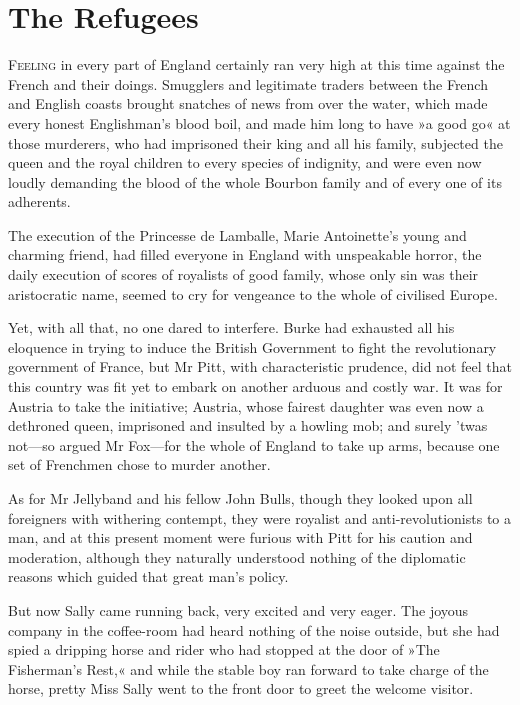 
\chapter{The Refugees}
\lettrine[lines=4]{F}{eeling} in every part of England certainly ran very high at this time against the French and their doings. Smugglers and legitimate traders between the French and English coasts brought snatches of news from over the water, which made every honest Englishman's blood boil, and made him long to have »a good go« at those murderers, who had imprisoned their king and all his family, subjected the queen and the royal children to every species of indignity, and were even now loudly demanding the blood of the whole Bourbon family and of every one of its adherents.

The execution of the Princesse de Lamballe, Marie Antoinette's young and charming friend, had filled everyone in England with unspeakable horror, the daily execution of scores of royalists of good family, whose only sin was their aristocratic name, seemed to cry for vengeance to the whole of civilised Europe.

Yet, with all that, no one dared to interfere. Burke had exhausted all his eloquence in trying to induce the British Government to fight the revolutionary government of France, but Mr Pitt, with characteristic prudence, did not feel that this country was fit yet to embark on another arduous and costly war. It was for Austria to take the initiative; Austria, whose fairest daughter was even now a dethroned queen, imprisoned and insulted by a howling mob; and surely 'twas not—so argued Mr Fox—for the whole of England to take up arms, because one set of Frenchmen chose to murder another.

As for Mr Jellyband and his fellow John Bulls, though they looked upon all foreigners with withering contempt, they were royalist and anti-revolutionists to a man, and at this present moment were furious with Pitt for his caution and moderation, although they naturally understood nothing of the diplomatic reasons which guided that great man's policy.

But now Sally came running back, very excited and very eager. The joyous company in the coffee-room had heard nothing of the noise outside, but she had spied a dripping horse and rider who had stopped at the door of »The Fisherman's Rest,« and while the stable boy ran forward to take charge of the horse, pretty Miss Sally went to the front door to greet the welcome visitor.

